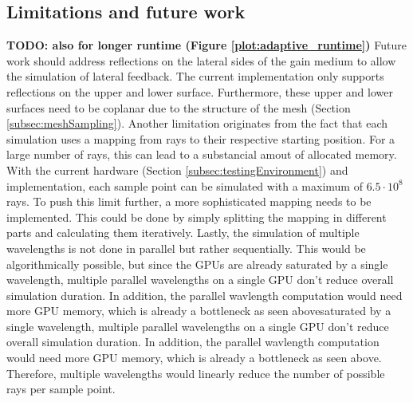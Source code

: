 \subsection{Limitations and future work}
\label{subsec:limitations}
\textbf{TODO: also for longer runtime (Figure \ref{plot:adaptive_runtime})}
Future work should address reflections on the lateral sides of the gain medium
to allow the simulation of lateral feedback. The current implementation only
supports reflections on the upper and lower surface. Furthermore, these upper
and lower surfaces need to be coplanar due to the structure of the mesh
(Section \ref{subsec:meshSampling}).
Another limitation originates from the fact that each simulation uses a mapping
from rays to their respective starting position. For a large number of rays,
this can lead to a substancial amout of allocated memory. With the current
hardware (Section \ref{subsec:testingEnvironment}) and implementation, each sample
point can be simulated with a maximum of $6.5\cdot10^8$ rays. To push this limit
further, a more sophisticated mapping needs to be implemented. This could
be done by simply splitting the mapping in different parts and calculating them
iteratively.
Lastly, the simulation of multiple wavelengths is not done in parallel but
rather sequentially. This would be algorithmically possible, but since the GPUs
are already saturated by a single wavelength, multiple parallel wavelengths on a
single GPU don't reduce overall simulation duration. In addition, the parallel
wavlength computation would need more GPU memory, which is already a bottleneck
as seen abovesaturated by a single wavelength, multiple parallel wavelengths on
a single GPU don't reduce overall simulation duration. In addition, the parallel
wavlength computation would need more GPU memory, which is already a bottleneck
as seen above. Therefore, multiple wavelengths would linearly reduce the number
of possible rays per sample point.
